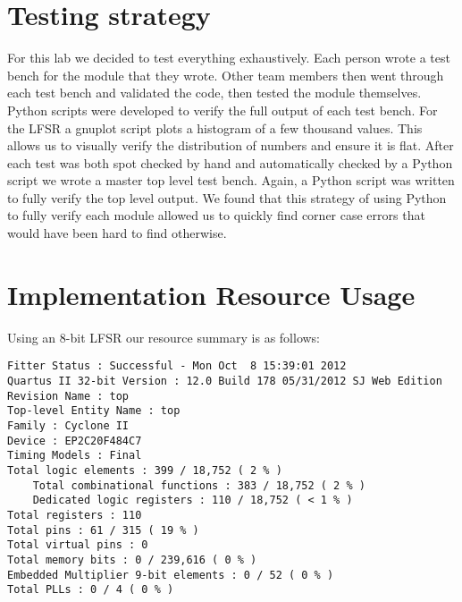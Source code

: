 \documentclass[12pt]{article}
\begin{document}
\section*{Testing strategy}
For this lab we decided to test everything exhaustively. Each person wrote a test bench for the module that they wrote. Other team members then went through each test bench and validated the code, then tested the module themselves. Python scripts were developed to verify the full output of each test bench. For the LFSR a gnuplot script plots a histogram of a few thousand values. This allows us to visually verify the distribution of numbers and ensure it is flat. After each test was both spot checked by hand and automatically checked by a Python script we wrote a master top level test bench. Again, a Python script was written to fully verify the top level output. We found that this strategy of using Python to fully verify each module allowed us to quickly find corner case errors that would have been hard to find otherwise.


\section*{Implementation Resource Usage}


Using an 8-bit LFSR our resource summary is as follows:

\begin{verbatim}
Fitter Status : Successful - Mon Oct  8 15:39:01 2012
Quartus II 32-bit Version : 12.0 Build 178 05/31/2012 SJ Web Edition
Revision Name : top
Top-level Entity Name : top
Family : Cyclone II
Device : EP2C20F484C7
Timing Models : Final
Total logic elements : 399 / 18,752 ( 2 % )
    Total combinational functions : 383 / 18,752 ( 2 % )
    Dedicated logic registers : 110 / 18,752 ( < 1 % )
Total registers : 110
Total pins : 61 / 315 ( 19 % )
Total virtual pins : 0
Total memory bits : 0 / 239,616 ( 0 % )
Embedded Multiplier 9-bit elements : 0 / 52 ( 0 % )
Total PLLs : 0 / 4 ( 0 % )
\end{verbatim}
\end{document}
